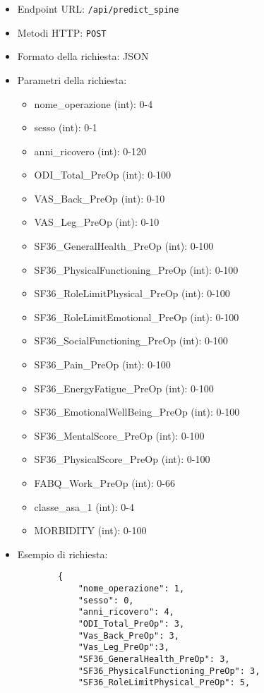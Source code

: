 \begin{itemize}
  \item Endpoint URL: \verb|/api/predict_spine|
  \item Metodi HTTP: \verb|POST|
  \item Formato della richiesta: JSON
  \item Parametri della richiesta:
    \begin{itemize}
    \item nome\_operazione (int): 0-4
        \item sesso (int): 0-1
        \item anni\_ricovero (int): 0-120
        \item ODI\_Total\_PreOp (int): 0-100
        \item VAS\_Back\_PreOp (int): 0-10
        \item VAS\_Leg\_PreOp (int): 0-10
        \item SF36\_GeneralHealth\_PreOp (int): 0-100
        \item SF36\_PhysicalFunctioning\_PreOp (int): 0-100
        \item SF36\_RoleLimitPhysical\_PreOp (int): 0-100
        \item SF36\_RoleLimitEmotional\_PreOp (int): 0-100
        \item SF36\_SocialFunctioning\_PreOp (int): 0-100
        \item SF36\_Pain\_PreOp (int): 0-100
        \item SF36\_EnergyFatigue\_PreOp (int): 0-100
        \item SF36\_EmotionalWellBeing\_PreOp (int): 0-100
        \item SF36\_MentalScore\_PreOp (int): 0-100
        \item SF36\_PhysicalScore\_PreOp (int): 0-100
        \item FABQ\_Work\_PreOp (int): 0-66
        \item classe\_asa\_1 (int): 0-4
        \item MORBIDITY (int): 0-100        
    \end{itemize}
  \item Esempio di richiesta:
    \begin{verbatim}
        {
            "nome_operazione": 1,
            "sesso": 0,
            "anni_ricovero": 4,
            "ODI_Total_PreOp": 3,
            "Vas_Back_PreOp": 3,
            "Vas_Leg_PreOp":3,
            "SF36_GeneralHealth_PreOp": 3,
            "SF36_PhysicalFunctioning_PreOp": 3,
            "SF36_RoleLimitPhysical_PreOp": 5,

\end{verbatim}
\end{itemize}
